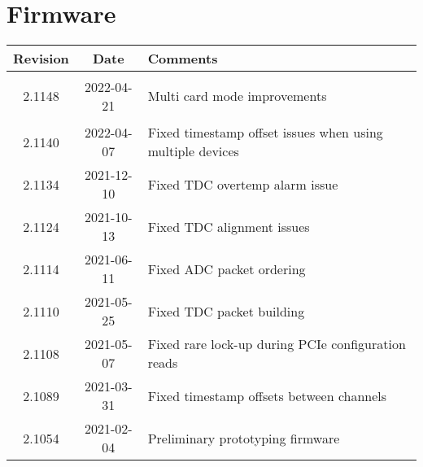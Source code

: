 \section{Firmware}
\begin{tabularx}{\textwidth}{|c|c|X|}
    \hline
    Revision & Date & Comments\\
    \hline\hline
	\hypertarget{fwrev}{2.1148} & 2022-04-21 & Multi card mode improvements\\
	\hline
	2.1140 & 2022-04-07 & Fixed timestamp offset issues when using multiple devices\\
	\hline
	2.1134 & 2021-12-10 & Fixed TDC overtemp alarm issue\\
	\hline
	2.1124 & 2021-10-13 & Fixed TDC alignment issues\\
	\hline
	2.1114 & 2021-06-11 & Fixed ADC packet ordering\\
	\hline
	2.1110 & 2021-05-25 & Fixed TDC packet building\\
	\hline
	2.1108 & 2021-05-07 & Fixed rare lock-up during PCIe configuration reads\\
	\hline
	2.1089 & 2021-03-31 & Fixed timestamp offsets between channels\\
	\hline
    2.1054 & 2021-02-04 & Preliminary prototyping firmware\\
    \hline
\end{tabularx}
